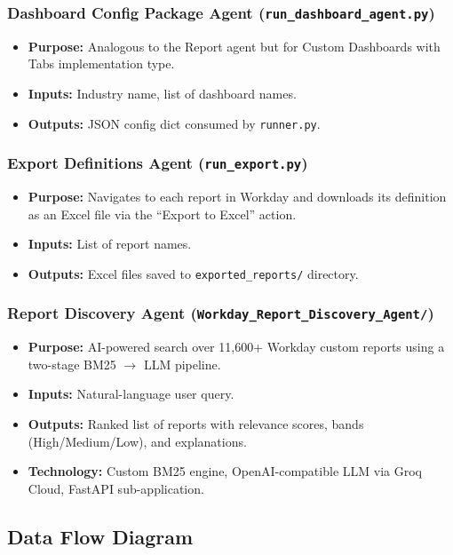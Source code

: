 \documentclass[12pt,a4paper]{article}
\begin{document}
\subsubsection{Dashboard Config Package Agent (\texttt{run\_dashboard\_agent.py})}
\begin{itemize}[leftmargin=2em]
  \item \textbf{Purpose:} Analogous to the Report agent but for Custom Dashboards with Tabs implementation type.
  \item \textbf{Inputs:} Industry name, list of dashboard names.
  \item \textbf{Outputs:} JSON config dict consumed by \texttt{runner.py}.
\end{itemize}

\subsubsection{Export Definitions Agent (\texttt{run\_export.py})}
\begin{itemize}[leftmargin=2em]
  \item \textbf{Purpose:} Navigates to each report in Workday and downloads its definition as an Excel file via the ``Export to Excel'' action.
  \item \textbf{Inputs:} List of report names.
  \item \textbf{Outputs:} Excel files saved to \texttt{exported\_reports/} directory.
\end{itemize}

\subsubsection{Report Discovery Agent (\texttt{Workday\_Report\_Discovery\_Agent/})}
\begin{itemize}[leftmargin=2em]
  \item \textbf{Purpose:} AI-powered search over 11,600+ Workday custom reports using a two-stage BM25 $\rightarrow$ LLM pipeline.
  \item \textbf{Inputs:} Natural-language user query.
  \item \textbf{Outputs:} Ranked list of reports with relevance scores, bands (High/Medium/Low), and explanations.
  \item \textbf{Technology:} Custom BM25 engine, OpenAI-compatible LLM via Groq Cloud, FastAPI sub-application.
\end{itemize}

\subsection{Data Flow Diagram}
\label{subsec:data-flow}
\end{document}
